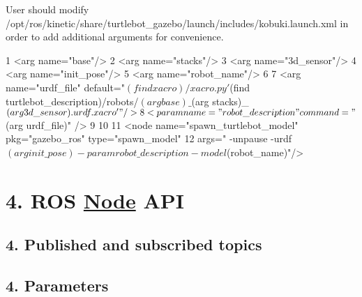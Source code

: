 User should modify {\ttfamily /opt/ros/kinetic/share/turtlebot\+\_\+gazebo/launch/includes/kobuki.launch.\+xml} in order to add additional arguments for convenience.


\begin{DoxyCode}
1 <arg name="base"/>
2 <arg name="stacks"/>
3 <arg name="3d\_sensor"/>
4 <arg name="init\_pose"/>
5 <arg name="robot\_name"/>
6 
7 <arg name="urdf\_file" default="$(find xacro)/xacro.py '$(find turtlebot\_description)/robots/$(arg
       base)\_$(arg stacks)\_$(arg 3d\_sensor).urdf.xacro'" />
8 <param name="robot\_description" command="$(arg urdf\_file)" />
9 
10 
11 <node name="spawn\_turtlebot\_model" pkg="gazebo\_ros" type="spawn\_model"
12       args=" -unpause -urdf $(arg init\_pose) -param robot\_description -model $(robot\_name)"/>
\end{DoxyCode}


\section*{4. R\+OS \hyperlink{struct_node}{Node} A\+PI}

\subsection*{4. Published and subscribed topics}

\subsection*{4. Parameters}

\subsection*{}